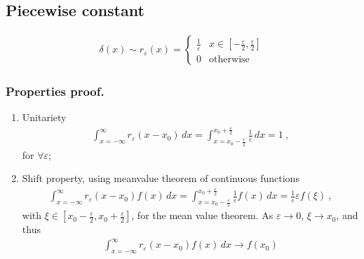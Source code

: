 \documentclass[letterpaper,10pt,english]{jupyterBook}
\begin{document}
\subsection{Piece\sphinxhyphen{}wise constant}
\label{\detokenize{ch/functional-analysis/dirac-delta:piece-wise-constant}}\label{\detokenize{ch/functional-analysis/dirac-delta:functional-analysis-dirac-delta-approximations-box}}\begin{equation*}
\begin{split}\delta(x) \sim r_{\varepsilon}(x) = \begin{cases} \frac{1}{\varepsilon} & x \in \left[-\frac{\varepsilon}{2}, \frac{\varepsilon}{2} \right] \\ 0 & \text{otherwise} \end{cases}\end{split}
\end{equation*}\subsubsection*{Properties \sphinxhyphen{} proof.}
\begin{enumerate}
%
\item {} 
\sphinxAtStartPar
Unitariety
\begin{equation*}
\begin{split}\int_{x=-\infty}^{\infty} r_{\varepsilon}(x-x_0) \, dx = \int_{x=x_0-\frac{\varepsilon}{2}}^{x_0+\frac{\varepsilon}{2}} \frac{1}{\varepsilon} \, dx = 1 \ ,  \end{split}
\end{equation*}
\sphinxAtStartPar
for \(\forall \varepsilon\);

\item {} 
\sphinxAtStartPar
Shift property, using mean\sphinxhyphen{}value theorem of continuous functions
\begin{equation*}
\begin{split}\int_{x=-\infty}^{\infty} r_{\varepsilon}(x-x_0) f(x) \, dx = \int_{x=x_0-\frac{\varepsilon}{2}}^{x_0+\frac{\varepsilon}{2}} \frac{1}{\varepsilon} f(x) \, dx = \frac{1}{\varepsilon} \varepsilon f(\xi) \ ,  \end{split}
\end{equation*}
\sphinxAtStartPar
with \(\xi \in \left[x_0-\frac{\varepsilon}{2}, x_0+\frac{\varepsilon}{2}\right]\), for the mean value theorem. As \(\varepsilon \rightarrow 0\), \(\xi \rightarrow x_0\), and thus
\begin{equation*}
\begin{split}\int_{x=-\infty}^{\infty} r_{\varepsilon}(x-x_0) f(x) \, dx \rightarrow f(x_0) \end{split}
\end{equation*}
\end{enumerate}
\end{document}
